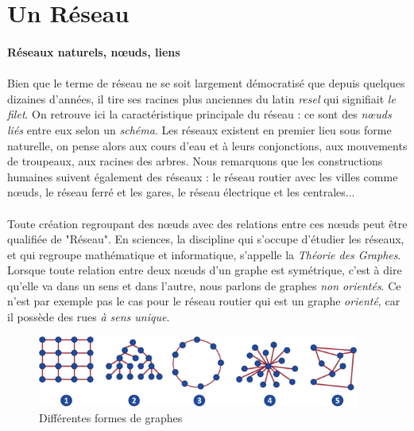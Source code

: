 \section{Un Réseau}

\paragraph{Réseaux naturels, n\oe{}uds, liens} \label{natural_networks}

\paragraph{} Bien que le terme de réseau ne se soit largement démocratisé que depuis quelques dizaines d'années, il tire ses
racines plus anciennes du latin \emph{resel} qui signifiait \emph{le filet}. On retrouve ici la caractéristique
principale du réseau : ce sont des \emph{n\oe{}uds liés} entre eux selon un \emph{schéma}. Les réseaux existent en
premier lieu sous forme naturelle, on pense alors aux cours d'eau et à leurs conjonctions, aux mouvements de troupeaux,
aux racines des arbres. Nous remarquons que les constructions humaines suivent également des réseaux : le réseau routier
avec les villes comme n\oe{}uds, le réseau ferré et les gares, le réseau électrique et les centrales...

\paragraph{} Toute création regroupant des n\oe{}uds avec des relations entre ces n\oe{}uds peut être qualifiée de "Réseau". En sciences,
la discipline qui s'occupe d'étudier les réseaux, et qui regroupe mathématique et informatique, s'appelle
la \emph{Théorie des Graphes}. Lorsque toute relation entre deux n\oe{}uds d'un graphe est symétrique, c'est à dire qu'elle va
dans un sens et dans l'autre, nous parlons de graphes \emph{non orientés}. Ce n'est par exemple pas le cas pour le
réseau routier qui est un graphe \emph{orienté}, car il possède des rues \emph{à sens unique}.

\begin{figure}[h]
    \centering
    \includegraphics[width=400px]{chapters/02/images/reseaux.png}
    \caption{\label{network_graphs} Différentes formes de graphes}
\end{figure}

